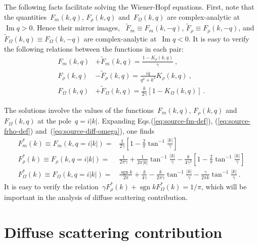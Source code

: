 \documentclass[preprint,aps,eqsecnum]{revtex4-1}
\renewcommand{\Im}{\mathop{\mathrm{Im}}\nolimits}
\newcommand{\sgn}{\mathop{\mathrm{sgn}}\nolimits}
\begin{document}
The following facts facilitate solving the Wiener-Hopf equations.
First, note that the quantities~$F_m(k, q)$, $F_\rho(k, q)$
and~$F_\Omega(k, q)$ are
complex-analytic at~$\Im q > 0$. Hence their mirror images,
~$\tilde{F}_m \equiv F_m(k, -q)$,
${\tilde F}_{\rho} \equiv F_\rho(k, -q)$,
and~$\tilde{F}_\Omega(k, q) \equiv F_\Omega(k, -q)$ are
complex-analytic at~$\Im q < 0$. It is easy to verify the following relations
between the functions in each pair:
\begin{align}
  \label{eq:fm-identity}
  F_m(k, q) &+ \tilde{F}_m(k, q) = \frac{1 - K_\rho(k, q)}{\gamma} \ , \\
  \label{eq:frho-identity}
  F_\rho(k, q) &- \tilde{F}_\rho(k, q) = \frac{i q}{q^2 + k^2} K_\rho(k, q)
  \ ,\\
  \label{eq:fomega-identity}
  F_\Omega(k, q) &+ \tilde{F}_\Omega(k, q)
          = \frac{k}{2\gamma} \left[1 - K_\Omega(k, q)\right]
  \ .
\end{align}

The solutions involve the values of the functions~$F_m(k, q)$,
$F_\rho(k, q)$ and~$F_\Omega(k, q)$ at the pole~$q = i |k|$.
Expanding Eqs.(\ref{eq:source-fm-def}), (\ref{eq:source-frho-def})
and~(\ref{eq:source-diff-omega}), one finds
\begin{align}
  \label{eq:fm-star}
  F_m^\ast(k) \equiv F_m(k, q = i |k|)
       ={}& \frac{1}{2\gamma}
        \left[ 1 - \frac{2}{\pi}\tan^{-1}\frac{|k|}{\gamma} \right] \\
  \label{eq:frho-star}
  F_\rho^\ast(k) \equiv F_\rho(k, q = i |k|)
  ={}&  \frac{1}{2\pi \gamma} + \frac{1}{2\pi |k|} \tan^{-1}\frac{|k|}{\gamma}
  - \frac{k}{4\gamma^2}
    \left[1 - \frac{2}{\pi} \tan^{-1} \frac{|k|}{\gamma}\right]
  \\
  \label{eq:fomega-star}
  F_\Omega^\ast(k) \equiv F_\Omega(k, q = i |k|)
  ={}& \frac{\sgn k}{2\pi} +  \frac{k}{4\gamma}
       - \frac{k}{2\pi \gamma}  \tan^{-1}\frac{|k|}{\gamma}
       - \frac{\gamma}{2\pi k}  \tan^{-1}\frac{|k|}{\gamma}
  \ .
\end{align}
It is easy to verify
the relation~$\gamma F_\rho^\ast(k) + \sgn k F_\Omega^\ast(k) = 1/\pi$,
which will be important in the analysis of diffuse scattering contribution.

\section{Diffuse scattering contribution}
\label{sec:diffuse}
\end{document}
